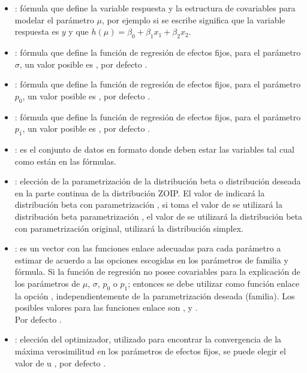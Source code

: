 \begin{itemize}[noitemsep, nolistsep]

\item {}: f\'{o}rmula que define la variable respuesta y la estructura de covariables para modelar el par\'{a}metro $\mu$, por ejemplo si se escribe  significa que la variable respuesta es $y$ y que $h(\mu)=\beta_0 + \beta_1 x_1 + \beta_2 x_2$.
\item {}: f\'{o}rmula que define la funci\'{o}n de regresi\'{o}n de efectos fijos, para el par\'{a}metro $\sigma$, un valor posible es , por defecto .
\item {}: f\'{o}rmula que define la funci\'{o}n de regresi\'{o}n de efectos fijos, para el par\'{a}metro $p_0$, un valor posible es , por defecto .
\item {}: f\'{o}rmula que define la funci\'{o}n de regresi\'{o}n de efectos fijos, para el par\'{a}metro $p_1$, un valor posible es , por defecto .
\item {}: es el conjunto de datos en formato  donde deben estar las variables tal cual como est\'{a}n en las f\'{o}rmulas.
\item {}: elecci\'{o}n de la parametrizaci\'{o}n de la distribuci\'{o}n beta o distribuci\'{o}n deseada en la parte continua de la distribuci\'{o}n ZOIP. El valor de  indicar\'{a} la distribuci\'{o}n beta con parametrizaci\'{o}n \cite{Stasinopoulos2}, si toma el valor de  se utilizar\'{a} la distribuci\'{o}n beta parametrizaci\'{o}n \cite{Ferrari2}, el valor de  se utilizar\'{a} la distribuci\'{o}n beta con parametrizaci\'{o}n original,  utilizar\'{a} la distribuci\'{o}n simplex.
\item {}: es un vector con las funciones enlace adecuadas para cada par\'{a}metro a estimar de acuerdo a las opciones escogidas en los par\'{a}metros de familia y f\'{o}rmula. Si la funci\'{o}n de regresi\'{o}n no posee covariables para la explicaci\'{o}n de los par\'{a}metros de $\mu$, $\sigma$, $p_0$ o $p_1$; entonces se debe utilizar como funci\'{o}n enlace la opci\'{o}n , independientemente de la parametrizaci\'{o}n deseada (familia). Los posibles valores para las funciones enlace son ,  y .\\
Por defecto .
\item {}: elecci\'{o}n del optimizador, utilizado para encontrar la convergencia de la m\'{a}xima verosimilitud en los par\'{a}metros de efectos fijos, se puede elegir el valor de  u , por defecto .


\end{itemize}


